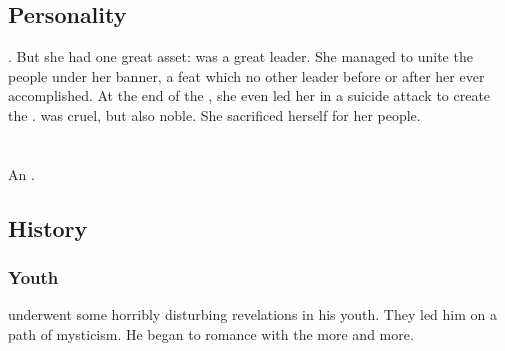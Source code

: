 








\subsection{Personality}
\Kserasshana{} . 
But she had one great asset: 
\Kserasshana{} was a great leader. 
She managed to unite the \dzraicchenoss{} people under her banner, a feat which no other leader before or after her ever accomplished. 
At the end of the \firstbanewar, she even led her \firstgendragons{} in a suicide attack to create the . 
\Kserasshana{} was cruel, but also noble. 
She sacrificed herself for her people. 















\section{\VardredSethicus}
\index{\Sethicus}
An \ophidian. 









\subsection{History}





\subsubsection{Youth}
\Sethicus underwent some horribly disturbing revelations in his youth.
They led him on a path of mysticism.
He began to romance with the \xss more and more. 

